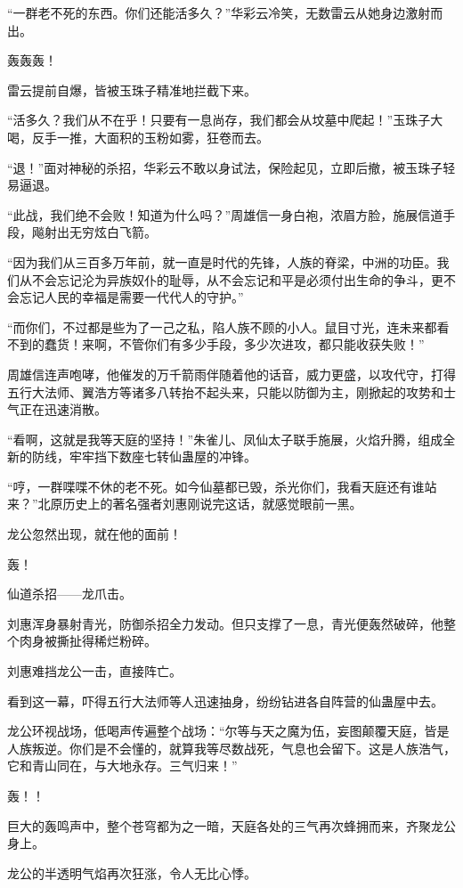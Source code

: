 \begin{this_body}
“一群老不死的东西。你们还能活多久？”华彩云冷笑，无数雷云从她身边激射而出。

轰轰轰！

雷云提前自爆，皆被玉珠子精准地拦截下来。

“活多久？我们从不在乎！只要有一息尚存，我们都会从坟墓中爬起！”玉珠子大喝，反手一推，大面积的玉粉如雾，狂卷而去。

“退！”面对神秘的杀招，华彩云不敢以身试法，保险起见，立即后撤，被玉珠子轻易逼退。

“此战，我们绝不会败！知道为什么吗？”周雄信一身白袍，浓眉方脸，施展信道手段，飚射出无穷炫白飞箭。

“因为我们从三百多万年前，就一直是时代的先锋，人族的脊梁，中洲的功臣。我们从不会忘记沦为异族奴仆的耻辱，从不会忘记和平是必须付出生命的争斗，更不会忘记人民的幸福是需要一代代人的守护。”

“而你们，不过都是些为了一己之私，陷人族不顾的小人。鼠目寸光，连未来都看不到的蠢货！来啊，不管你们有多少手段，多少次进攻，都只能收获失败！”

周雄信连声咆哮，他催发的万千箭雨伴随着他的话音，威力更盛，以攻代守，打得五行大法师、翼浩方等诸多八转抬不起头来，只能以防御为主，刚掀起的攻势和士气正在迅速消散。

“看啊，这就是我等天庭的坚持！”朱雀儿、凤仙太子联手施展，火焰升腾，组成全新的防线，牢牢挡下数座七转仙蛊屋的冲锋。

“哼，一群喋喋不休的老不死。如今仙墓都已毁，杀光你们，我看天庭还有谁站来？”北原历史上的著名强者刘惠刚说完这话，就感觉眼前一黑。

龙公忽然出现，就在他的面前！

轰！

仙道杀招——龙爪击。

刘惠浑身暴射青光，防御杀招全力发动。但只支撑了一息，青光便轰然破碎，他整个肉身被撕扯得稀烂粉碎。

刘惠难挡龙公一击，直接阵亡。

看到这一幕，吓得五行大法师等人迅速抽身，纷纷钻进各自阵营的仙蛊屋中去。

龙公环视战场，低喝声传遍整个战场：“尔等与天之魔为伍，妄图颠覆天庭，皆是人族叛逆。你们是不会懂的，就算我等尽数战死，气息也会留下。这是人族浩气，它和青山同在，与大地永存。三气归来！”

轰！！

巨大的轰鸣声中，整个苍穹都为之一暗，天庭各处的三气再次蜂拥而来，齐聚龙公身上。

龙公的半透明气焰再次狂涨，令人无比心悸。


\end{this_body}
